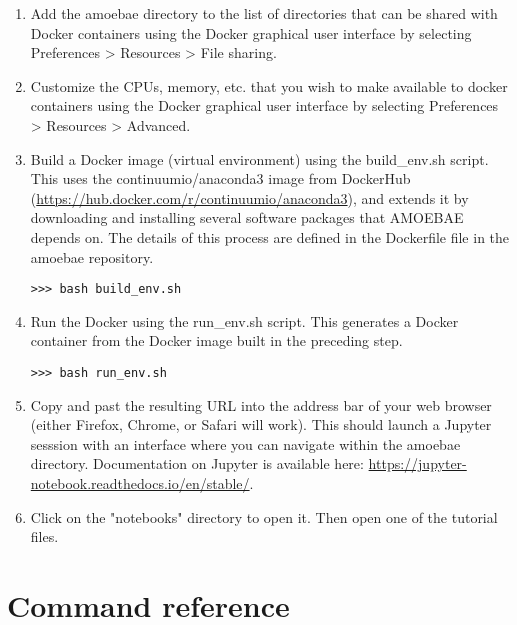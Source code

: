 \documentclass[12pt,letterpaper]{article}
\begin{document}
\begin{linenumbers}
\begin{enumerate}
\item Add the amoebae directory to the list of directories that can be shared
    with Docker containers using the Docker graphical user interface by
    selecting Preferences > Resources > File sharing.


\item Customize the CPUs, memory, etc. that you wish to make available to
    docker containers using the Docker graphical user interface by
    selecting Preferences > Resources > Advanced.


\item Build a Docker image (virtual environment) using the build\_env.sh
    script. This uses the continuumio/anaconda3 image from DockerHub
    (\url{https://hub.docker.com/r/continuumio/anaconda3}), and extends it by
    downloading and installing several software packages that AMOEBAE depends
    on. The details of this process are defined in the Dockerfile file in
    the amoebae repository. 

\begin{lstlisting}
>>> bash build_env.sh
\end{lstlisting}


\item Run the Docker using the run\_env.sh script. This generates a Docker
    container from the Docker image built in the preceding step. 

\begin{lstlisting}
>>> bash run_env.sh
\end{lstlisting}


\item Copy and past the resulting URL into the address bar of your web browser
    (either Firefox, Chrome, or Safari will work). This should launch a Jupyter
    sesssion with an interface where you can navigate within the amoebae directory.
    Documentation on Jupyter is available here:
    \url{https://jupyter-notebook.readthedocs.io/en/stable/}. 


\item Click on the "notebooks" directory to open it. Then open one of the
    tutorial files.  


\end{enumerate}

\section{Command reference}


\end{linenumbers}
\end{document}
